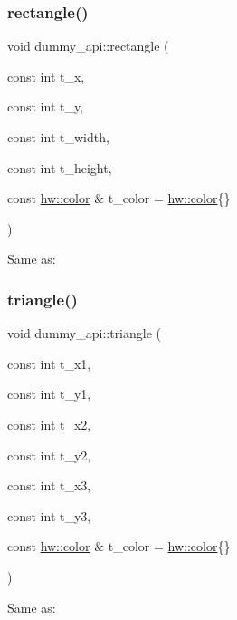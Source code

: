 \subsubsection{\texorpdfstring{rectangle()}{rectangle()}\hspace{0.1cm}{\footnotesize\ttfamily [2/2]}}
{\footnotesize\ttfamily void dummy\+\_\+api\+::rectangle (\begin{DoxyParamCaption}\item[{const int}]{t\+\_\+x,  }\item[{const int}]{t\+\_\+y,  }\item[{const int}]{t\+\_\+width,  }\item[{const int}]{t\+\_\+height,  }\item[{const \mbox{\hyperlink{structhw_1_1color}{hw\+::color}} \&}]{t\+\_\+color = {\ttfamily \mbox{\hyperlink{structhw_1_1color}{hw\+::color}}\{\}} }\end{DoxyParamCaption})}

Same as\+: 
\begin{DoxyCode}{0}
\end{DoxyCode}
 \mbox{\label{namespacedummy__api_a39986f66e60a435145031fa476129332}} 
\subsubsection{\texorpdfstring{triangle()}{triangle()}}
{\footnotesize\ttfamily void dummy\+\_\+api\+::triangle (\begin{DoxyParamCaption}\item[{const int}]{t\+\_\+x1,  }\item[{const int}]{t\+\_\+y1,  }\item[{const int}]{t\+\_\+x2,  }\item[{const int}]{t\+\_\+y2,  }\item[{const int}]{t\+\_\+x3,  }\item[{const int}]{t\+\_\+y3,  }\item[{const \mbox{\hyperlink{structhw_1_1color}{hw\+::color}} \&}]{t\+\_\+color = {\ttfamily \mbox{\hyperlink{structhw_1_1color}{hw\+::color}}\{\}} }\end{DoxyParamCaption})}

Same as\+: 
\begin{DoxyCode}{0}
\end{DoxyCode}
 